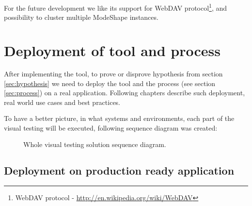 \documentclass[11pt,oneside,final]{fithesis2}
\begin{document}
    For the future development we like its support for 
    WebDAV protocol\footnote{WebDAV protocol - \url{http://en.wikipedia.org/wiki/WebDAV}}, and possibility to cluster multiple
    ModeShape instances.
    
\chapter{Deployment of tool and process}
After implementing the tool, to prove or disprove hypothesis from section \ref{sec:hypothesis} we need to deploy the tool and the
process (see section \ref{sec:process}) on a real application. Following chapters describe such deployment, real world use cases
and best practices.

To have a better picture, in what systems and environments, each part of the visual testing will be executed, following
sequence diagram was created:

\begin{figure}[!htb]
      \begin{center}
      \leavevmode
      \centerline{}
      \end{center}
      \caption{Whole visual testing solution sequence diagram.}
      \label{fig:wholeSolutionSequenceDiagram}
\end{figure}

  \section{Deployment on production ready application}
  
\end{document}
